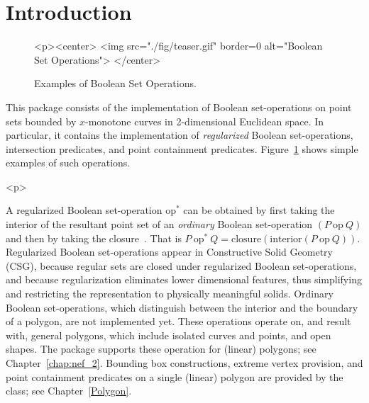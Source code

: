 \newcommand{\reals}{{\rm I\!\hspace{-0.025em} R}}
\newcommand{\calC}{{\cal C}}
\newcommand{\calA}{{\cal A}}
\newcommand{\eps}{{\varepsilon}}
\newcommand{\dcel}{{\sc Dcel}}
\newcommand{\naive}{na\"{\i}ve}
\newcommand{\kdtree}{{\sc Kd}-tree}

\section{Introduction}
\label{bobs_sec:intro}
%
\begin{figure}[!htp]
\begin{ccTexOnly}

\end{ccTexOnly}
\begin{ccHtmlOnly}
  <p><center>
    <img src="./fig/teaser.gif" border=0 alt="Boolean Set Operations">
  </center>
\end{ccHtmlOnly}
\caption{Examples of Boolean Set Operations.} 
\label{fig:teaser}
\end{figure}

This package consists of the implementation of Boolean set-operations
on point sets bounded by $x$-monotone curves in 2-dimensional
Euclidean space. In particular, it contains the implementation of
{\em regularized} Boolean set-operations, intersection predicates, and
point containment predicates. Figure~\ref{fig:teaser} shows simple examples 
of such operations.

\begin{ccHtmlOnly}<p>\end{ccHtmlOnly}
A regularized Boolean set-operation $\mbox{op}^*$ can be obtained by
first taking the interior of the resultant point set of an {\em ordinary}
Boolean set-operation $(P\ \mbox{op}\ Q)$ and then by taking the
closure~\cite{cgal:h-sm-04}. That is
$P\ \mbox{op}^*\ Q = \mbox{closure}(\mbox{interior} (P\ \mbox{op}\ Q))$.
Regularized Boolean set-operations appear in Constructive Solid
Geometry (CSG), because regular sets are closed under regularized
Boolean set-operations, and because regularization eliminates lower
dimensional features, thus simplifying and restricting the
representation to physically meaningful solids.
Ordinary Boolean set-operations, which distinguish between the
interior and the boundary of a polygon, are not implemented yet. These
operations operate on, and result with, general polygons, which
include isolated curves and points, and open shapes. The 
package supports these operation for (linear) polygons; see
Chapter~\ref{chap:nef_2}. Bounding box constructions, extreme vertex
provision, and point containment predicates on a single (linear)
polygon are provided by the  class; see
Chapter~\ref{Polygon}.

